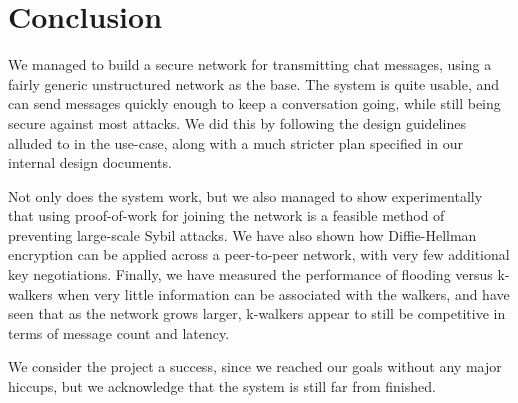 \section{Conclusion} We managed to build a secure network for transmitting chat messages, using a fairly generic unstructured network as the base. 
The system is quite usable, and can send messages quickly enough to keep a conversation going, while still being secure against most attacks. We did this by following the design guidelines alluded to in the use-case, along with a much stricter plan specified in our internal design documents.

Not only does  the system work, but we also managed to show experimentally that using proof-of-work for joining the network is a feasible method of preventing large-scale Sybil attacks. We have also shown how Diffie-Hellman encryption can be applied across a peer-to-peer network, with very few additional key negotiations. Finally, we have measured the performance of flooding versus k-walkers when very little information can be associated with the walkers, and have seen that as the network grows larger, k-walkers appear to still be competitive in terms of message count and latency.

We consider the project a success, since we reached our goals without any major hiccups, but we acknowledge that the system is still far from finished.